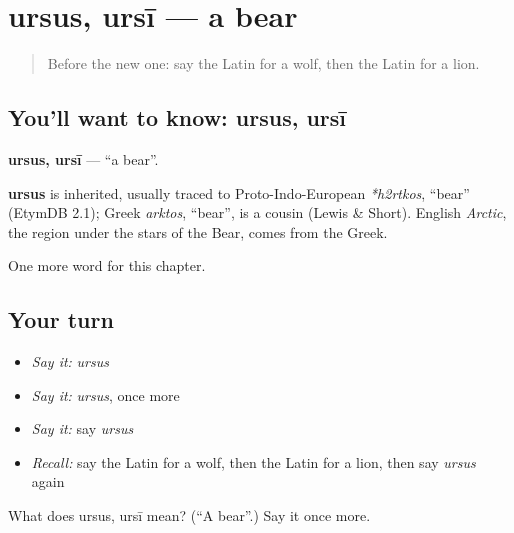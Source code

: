 \section[ursus, ursī]{ursus, ursī — a bear}

\label{lesson:LA-C91-ursus}



\begin{quote}
Before the new one: say the Latin for a wolf, then the Latin for a lion.
\end{quote}

\subsection*{You'll want to know: ursus, ursī}
\textbf{ursus, ursī} — \textquotedblleft{}a bear\textquotedblright{}.

\begin{cousinweb}
\textbf{ursus} is inherited, usually traced to Proto-Indo-European \emph{*h2rtkos}, \textquotedblleft{}bear\textquotedblright{} (EtymDB 2.1); Greek \emph{arktos}, \textquotedblleft{}bear\textquotedblright{}, is a cousin (Lewis \& Short). English \emph{Arctic}, the region under the stars of the Bear, comes from the Greek.
\end{cousinweb}

\begin{grammarlens}[title={What you've built}]
One more word for this chapter.
\end{grammarlens}

\subsection*{Your turn}
\begin{itemize}
\raggedright
  \item \emph{Say it:} \emph{ursus}
  \item \emph{Say it:} \emph{ursus}, once more
  \item \emph{Say it:} say \emph{ursus}
  \item \emph{Recall:} say the Latin for a wolf, then the Latin for a lion, then say \emph{ursus} again
\end{itemize}

\begin{tcolorbox}[breakable,colback=teal!4,colframe=teal!35!black,title={Before you move on}]
What does ursus, ursī mean? (\textquotedblleft{}A bear\textquotedblright{}.) Say it once more.
\end{tcolorbox}
